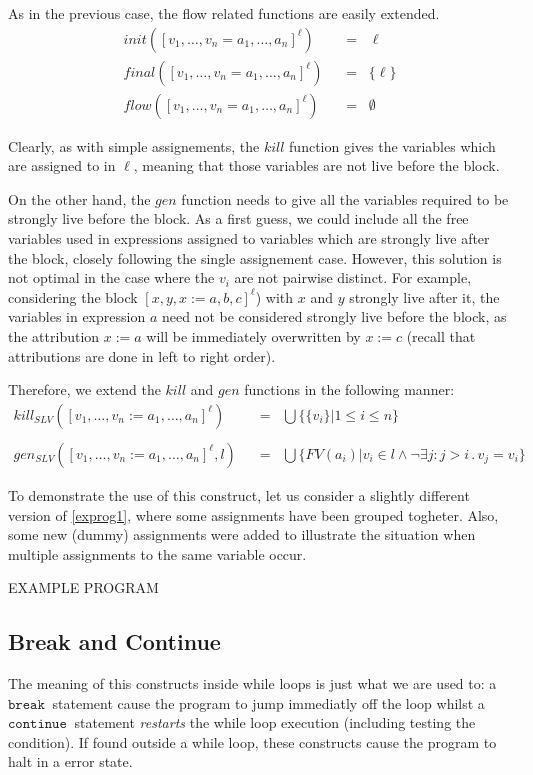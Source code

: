 \documentclass[a4wide,12pt]{article}
\def\eq{\;\; = \;\;}
\def\cont {\texttt{continue}\ }
\def\break{\texttt{break}\ }
\begin{document}
As in the previous case, the flow related functions are easily extended.
\begin{align*}
init ([v_1,\ldots,v_n = a_1,\ldots,a_n]^\ell) & \eq \ell \\
final([v_1,\ldots,v_n = a_1,\ldots,a_n]^\ell) & \eq \{\ell\} \\
flow ([v_1,\ldots,v_n = a_1,\ldots,a_n]^\ell) & \eq \emptyset
\end{align*}
 
Clearly, as with simple assignements, the $kill$
function gives the variables which are assigned to in $\ell$,
meaning that those variables are not live before the block.
 
On the other hand, the
$gen$ function needs to give all the variables required to be strongly live before the block.
As a first guess, we could include all the
free variables used in expressions assigned to variables which are strongly live after the block, closely following the
single assignement case. However, this solution is not optimal in the case where the $v_i$ are not pairwise distinct.
For example, considering the block $[x,y,x := a,b,c]^\ell$) with $x$ and $y$ strongly live after it, the variables in expression
$a$ need not be considered strongly live before the block, as the attribution $x:=a$ will be immediately overwritten
by $x:=c$ (recall that attributions are done in left to right order).
 
Therefore, we extend the $kill$ and $gen$ functions in the following manner:
\begin{align*}
kill_{SLV}([v_1,\ldots,v_n := a_1,\ldots,a_n]^\ell) & \eq \bigcup\{\{v_i\} | 1 \leq i\leq n\} \\
\\
gen_{SLV}([v_1,\ldots,v_n := a_1,\ldots,a_n]^\ell,l) & \eq \bigcup\{FV(a_i) | v_i \in l \wedge \neg \exists j : j>i \,.\, v_j = v_i\}
\end{align*}
 
To demonstrate the use of this construct, let us consider a slightly different version of
\ref{exprog1}, where some assignments have been grouped togheter. Also, some new (dummy)
assignments were added to illustrate the situation when multiple assignments to the same
variable occur.
 
EXAMPLE PROGRAM
 
\subsection{Break and Continue}
The meaning of this constructs inside while loops is just what we are used to:
a $\break$ statement cause the program to jump immediatly off the loop whilst
a $\cont$ statement \emph{restarts} the while loop execution (including testing the condition).
If found outside a while loop, these constructs cause the program to halt in a error state.
 
\end{document}
